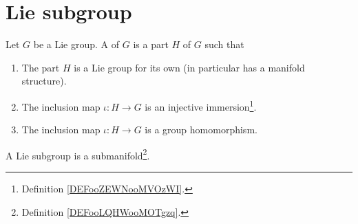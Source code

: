 \section{Lie subgroup}

\begin{definition}        \label{DEFooGCHDooHUMSju}
    Let \( G\) be a Lie group. A  of \( G\) is a part \( H\) of \( G\) such that
    \begin{enumerate}
        \item
            The part \( H\) is a Lie group for its own (in particular has a manifold structure).
        \item
            The inclusion map \( \iota\colon H\to G\) is an injective immersion\footnote{Definition \ref{DEFooZEWNooMVOzWI}.}.
        \item
            The inclusion map \( \iota\colon H\to G\) is a group homomorphism.
    \end{enumerate}
\end{definition}

\begin{proposition}     \label{PROPooFXZJooCOFXZX}
    A Lie subgroup is a submanifold\footnote{Definition \ref{DEFooLQHWooMOTgzq}.}. 
\end{proposition}

